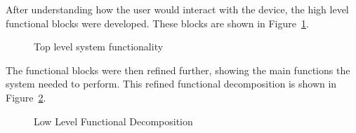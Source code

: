 \documentclass[12pt]{article} %
\begin{document}
    After understanding how the user would interact with the device, the high level
		functional blocks were developed. These blocks are shown in Figure~\ref{fig:func_top}.


    \begin{figure}[h]
      \centering
      \caption{Top level system functionality}
      \label{fig:func_top}
    \end{figure}

    The functional blocks were then refined further, showing the main functions
    the system needed to perform.  This refined functional decomposition is shown
    in Figure~\ref{fig:func_low}.

    \begin{figure}[h]
      \centering
      \caption{Low Level Functional Decomposition}
      \label{fig:func_low}
    \end{figure}
\end{document}
